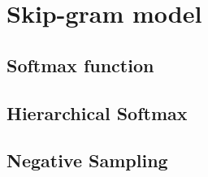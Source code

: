 
\section{Skip-gram model}


\subsection{Softmax function}


\subsection{Hierarchical Softmax}


\subsection{Negative Sampling}

